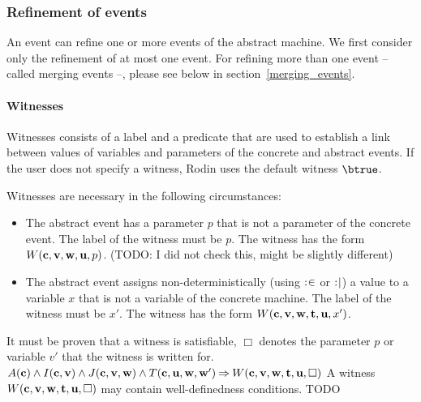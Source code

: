 \subsubsection{Refinement of events}
\label{refinement_of_events}
An event can refine one or more events of the abstract machine.
We first consider only the refinement of at most one event. 
For refining more than one event -- called merging events --, please see below in section~\ref{merging_events}.

\paragraph{Witnesses}
Witnesses consists of a label and a predicate that are used to establish a link between values 
  of variables and parameters of the concrete and abstract events.
If the user does not specify a witness, Rodin uses the default witness $\btrue$.

Witnesses are necessary in the following circumstances:
\begin{itemize}
\item The abstract event has a parameter $p$ that is not a parameter of the concrete
  event.
  The label of the witness must be $p$.
  The witness has the form $W(\textbf{c},{\textbf{v},\textbf{w}},\textbf{u},p)$.
  (TODO: I did not check this, might be slightly different)
\item The abstract event assigns non-deterministically (using $\mathrel{:\mkern1mu\in}$ or $\mathrel{:\mkern1mu\mid}$) 
  a value to a variable $x$ that is not a variable of the concrete machine.
  The label of the witness must be $x'$.
  The witness has the form $W(\textbf{c},{\textbf{v},\textbf{w}},{\textbf{t},\textbf{u}},x')$.
\end{itemize}

It must be proven that a witness is satisfiable, $\Box$ denotes the parameter $p$ or variable $v'$ that
  the witness is written for.
%
  {$A(\textbf{c}) \land I(\textbf{c},\textbf{v}) \land J(\textbf{c},{\textbf{v},\textbf{w}}) \land
    T(\textbf{c},\textbf{u},\textbf{w},\textbf{w}') \mathbin\Rightarrow
    W(\textbf{c},{\textbf{v},\textbf{w}},{\textbf{t},\textbf{u}},\Box)$}
A witness $W(\textbf{c},{\textbf{v},\textbf{w}},{\textbf{t},\textbf{u}},\Box)$ may contain well-definedness conditions.
%
  {TODO}

